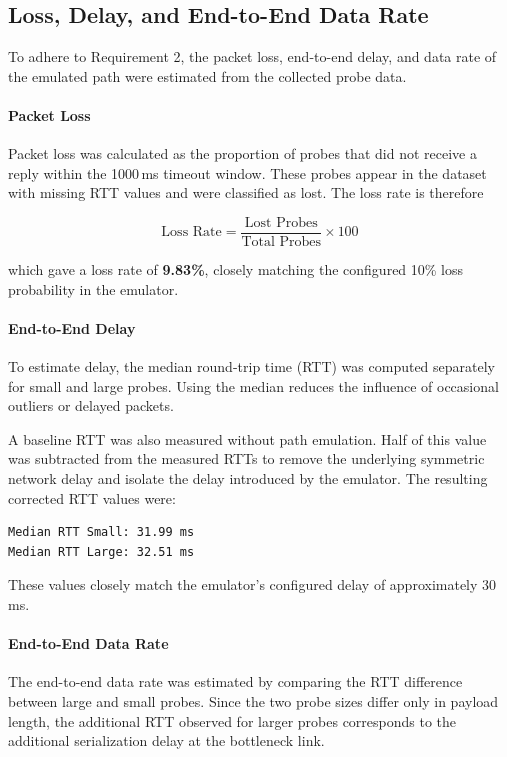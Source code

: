 \subsection{Loss, Delay, and End-to-End Data Rate}

To adhere to Requirement 2, the packet loss, end-to-end delay, and data rate of the emulated path were estimated from the collected probe data.

\paragraph{Packet Loss}

Packet loss was calculated as the proportion of probes that did not receive a reply within the 1000\,ms timeout window. These probes appear in the dataset with missing RTT values and were classified as lost. The loss rate is therefore

\[
\text{Loss Rate} = \frac{\text{Lost Probes}}{\text{Total Probes}} \times 100
\]

which gave a loss rate of \textbf{9.83\%}, closely matching the configured 10\% loss probability in the emulator.

\paragraph{End-to-End Delay}

To estimate delay, the median round-trip time (RTT) was computed separately for small and large probes. Using the median reduces the influence of occasional outliers or delayed packets.

A baseline RTT was also measured without path emulation. Half of this value was subtracted from the measured RTTs to remove the underlying symmetric network delay and isolate the delay introduced by the emulator. The resulting corrected RTT values were:

\begin{verbatim}
Median RTT Small: 31.99 ms
Median RTT Large: 32.51 ms
\end{verbatim}

These values closely match the emulator's configured delay of approximately 30\,ms.

\paragraph{End-to-End Data Rate}

The end-to-end data rate was estimated by comparing the RTT difference between large and small probes. Since the two probe sizes differ only in payload length, the additional RTT observed for larger probes corresponds to the additional serialization delay at the bottleneck link.

